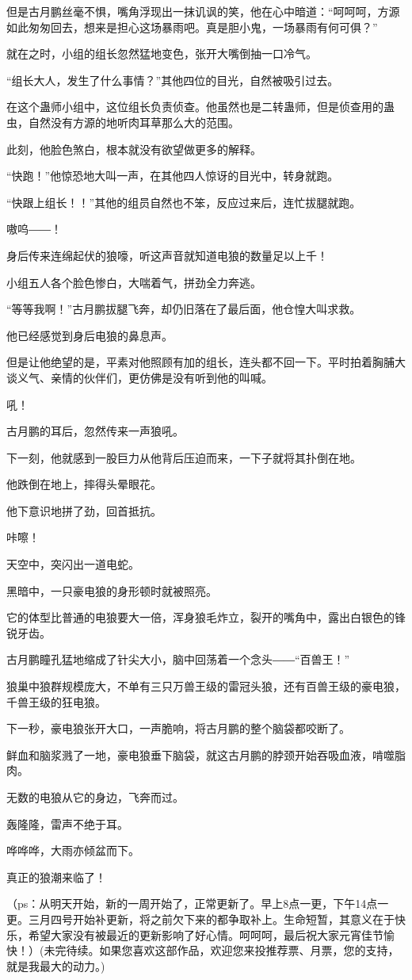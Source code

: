 \begin{this_body}
但是古月鹏丝毫不惧，嘴角浮现出一抹讥讽的笑，他在心中暗道：“呵呵呵，方源如此匆匆回去，想来是担心这场暴雨吧。真是胆小鬼，一场暴雨有何可俱？”

就在之时，小组的组长忽然猛地变色，张开大嘴倒抽一口冷气。

“组长大人，发生了什么事情？”其他四位的目光，自然被吸引过去。

在这个蛊师小组中，这位组长负责侦查。他虽然也是二转蛊师，但是侦查用的蛊虫，自然没有方源的地听肉耳草那么大的范围。

此刻，他脸色煞白，根本就没有欲望做更多的解释。

“快跑！”他惊恐地大叫一声，在其他四人惊讶的目光中，转身就跑。

“快跟上组长！！”其他的组员自然也不笨，反应过来后，连忙拔腿就跑。

嗷呜――！

身后传来连绵起伏的狼嚎，听这声音就知道电狼的数量足以上千！

小组五人各个脸色惨白，大喘着气，拼劲全力奔逃。

“等等我啊！”古月鹏拔腿飞奔，却仍旧落在了最后面，他仓惶大叫求救。

他已经感觉到身后电狼的鼻息声。

但是让他绝望的是，平素对他照顾有加的组长，连头都不回一下。平时拍着胸脯大谈义气、亲情的伙伴们，更仿佛是没有听到他的叫喊。

吼！

古月鹏的耳后，忽然传来一声狼吼。

下一刻，他就感到一股巨力从他背后压迫而来，一下子就将其扑倒在地。

他跌倒在地上，摔得头晕眼花。

他下意识地拼了劲，回首抵抗。

咔嚓！

天空中，突闪出一道电蛇。

黑暗中，一只豪电狼的身形顿时就被照亮。

它的体型比普通的电狼要大一倍，浑身狼毛炸立，裂开的嘴角中，露出白银色的锋锐牙齿。

古月鹏瞳孔猛地缩成了针尖大小，脑中回荡着一个念头――“百兽王！”

狼巢中狼群规模庞大，不单有三只万兽王级的雷冠头狼，还有百兽王级的豪电狼，千兽王级的狂电狼。

下一秒，豪电狼张开大口，一声脆响，将古月鹏的整个脑袋都咬断了。

鲜血和脑浆溅了一地，豪电狼垂下脑袋，就这古月鹏的脖颈开始吞吸血液，啃噬脂肉。

无数的电狼从它的身边，飞奔而过。

轰隆隆，雷声不绝于耳。

哗哗哗，大雨亦倾盆而下。

真正的狼潮来临了！

（ps：从明天开始，新的一周开始了，正常更新了。早上8点一更，下午14点一更。三月四号开始补更新，将之前欠下来的都争取补上。生命短暂，其意义在于快乐，希望大家没有被最近的更新影响了好心情。呵呵呵，最后祝大家元宵佳节愉快！）(未完待续。如果您喜欢这部作品，欢迎您来投推荐票、月票，您的支持，就是我最大的动力。)

\end{this_body}

